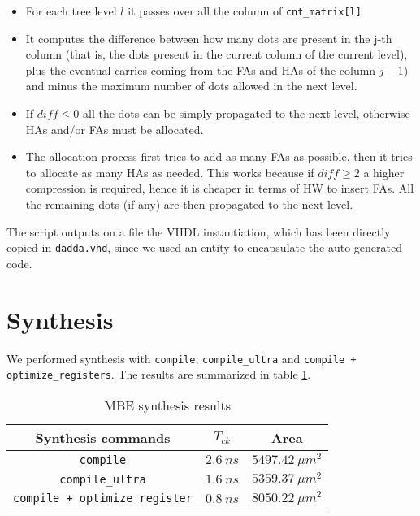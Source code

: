 \begin{itemize}
    \item For each tree level $l$ it passes over all the column of \verb|cnt_matrix[l]|
    \item It computes the difference between how many dots are present in the j-th column (that is, the dots present in the current column of the current level), plus the eventual carries coming from the FAs and HAs of the column $j-1$) and minus the maximum number of dots allowed in the next level.
    \item If $diff \leq 0$ all the dots can be simply propagated to the next level, otherwise HAs and/or FAs must be allocated.
    \item The allocation process first tries to add as many FAs as possible, then it tries to allocate as many HAs as needed. This works because if $diff \geq 2$ a higher compression is required, hence it is cheaper in terms of HW to insert FAs. All the remaining dots (if any) are then propagated to the next level.
\end{itemize}

The script outputs on a file the VHDL instantiation, which has been directly copied in \verb|dadda.vhd|, since we used an entity to encapsulate the auto-generated code. 

\section{Synthesis}

We performed synthesis with \verb|compile|, \verb|compile_ultra| and \verb|compile + optimize_registers|. The results are summarized
in table \ref{tab:ex2}.

\begin{table}[!ht]
    \centering
    \begin{tabular}{ |c|c|c| }
        \hline
        Synthesis commands & $T_{ck}$ & Area \\
        \hline
        \verb|compile| & $2.6\ ns$ & $5497.42\ \mu m^2$ \\
        \hline
        \verb|compile_ultra| & $1.6\ ns$ & $5359.37\ \mu m^2$ \\
        \hline
        \verb|compile + optimize_register| & $0.8\ ns$ & $8050.22\ \mu m^2$ \\
        \hline
    \end{tabular}
    \caption{MBE synthesis results}
    \label{tab:ex2}
\end{table}

